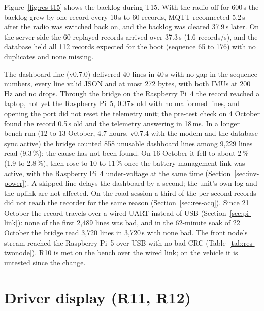 Figure~\ref{fig:res-t15} shows the backlog during T15. With the radio off for 600\,s the backlog grew by one record every 10\,s to 60 records, MQTT reconnected 5.2\,s after the radio was switched back on, and the backlog was cleared 37.9\,s later. On the server side the 60 replayed records arrived over 37.3\,s (1.6 records/s), and the database held all 112 records expected for the boot (sequence 65 to 176) with no duplicates and none missing.

The dashboard line (v0.7.0) delivered 40 lines in 40\,s with no gap in the sequence numbers, every line valid JSON and at most 272 bytes, with both IMUs at 200\,Hz and no drops. Through the bridge on the Raspberry Pi~4 the record reached a laptop, not yet the Raspberry Pi~5, 0.37\,s old with no malformed lines, and opening the port did not reset the telemetry unit; the pre-test check on 4 October found the record 0.5\,s old and the telemetry answering in 18\,ms. In a longer bench run (12 to 13 October, 4.7 hours, v0.7.4 with the modem and the database sync active) the bridge counted 858 unusable dashboard lines among 9,229 lines read (9.3\,\%); the cause has not been found. On 16 October it fell to about 2\,\% (1.9 to 2.8\,\%), then rose to 10 to 11\,\% once the battery-management link was active, with the Raspberry Pi~4 under-voltage at the same time (Section~\ref{sec:inv-power}). A skipped line delays the dashboard by a second; the unit's own log and the uplink are not affected. On the road session a third of the per-second records did not reach the recorder for the same reason (Section~\ref{sec:res-acq}). Since 21 October the record travels over a wired UART instead of USB (Section~\ref{sec:pi-link}): none of the first 2,489 lines was bad, and in the 62-minute soak of 22 October the bridge read 3,720 lines in 3,720\,s with none bad. The front node's stream reached the Raspberry Pi~5 over USB with no bad CRC (Table~\ref{tab:res-twonode}). R10 is met on the bench over the wired link; on the vehicle it is untested since the change.

\section{Driver display (R11, R12)}
\label{sec:resx-display}

